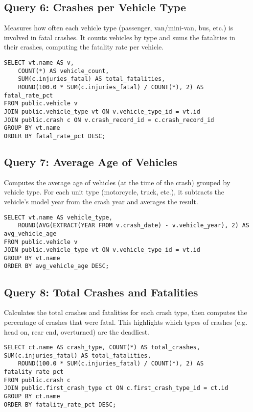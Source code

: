 \documentclass[12pt]{article}
\begin{document}
\subsection{Query 6: Crashes per Vehicle Type}

Measures how often each vehicle type (passenger, van/mini-van, bus, etc.) is involved in fatal crashes. It counts vehicles by type and sums the fatalities in their crashes, computing the fatality rate per vehicle.

{\scriptsize
\begin{verbatim}
SELECT vt.name AS v, 
    COUNT(*) AS vehicle_count, 
    SUM(c.injuries_fatal) AS total_fatalities,
    ROUND(100.0 * SUM(c.injuries_fatal) / COUNT(*), 2) AS fatal_rate_pct
FROM public.vehicle v
JOIN public.vehicle_type vt ON v.vehicle_type_id = vt.id
JOIN public.crash c ON v.crash_record_id = c.crash_record_id
GROUP BY vt.name
ORDER BY fatal_rate_pct DESC;
\end{verbatim}}


\subsection{Query 7: Average Age of Vehicles}


Computes the average age of vehicles (at the time of the crash) grouped by vehicle type. For each unit type (motorcycle, truck, etc.), it subtracts the vehicle’s model year from the crash year and averages the result.

{\scriptsize
\begin{verbatim}
SELECT vt.name AS vehicle_type,
    ROUND(AVG(EXTRACT(YEAR FROM v.crash_date) - v.vehicle_year), 2) AS avg_vehicle_age
FROM public.vehicle v
JOIN public.vehicle_type vt ON v.vehicle_type_id = vt.id
GROUP BY vt.name
ORDER BY avg_vehicle_age DESC;
\end{verbatim}}


\subsection{Query 8: Total Crashes and Fatalities}

Calculates the total crashes and fatalities for each crash type, then computes the percentage of crashes that were fatal. This highlights which types of crashes (e.g. head on, rear end, overturned) are the deadliest.

{\scriptsize
\begin{verbatim}
SELECT ct.name AS crash_type, COUNT(*) AS total_crashes, SUM(c.injuries_fatal) AS total_fatalities,
    ROUND(100.0 * SUM(c.injuries_fatal) / COUNT(*), 2) AS fatality_rate_pct
FROM public.crash c
JOIN public.first_crash_type ct ON c.first_crash_type_id = ct.id
GROUP BY ct.name
ORDER BY fatality_rate_pct DESC;
\end{verbatim}}
\end{document}
